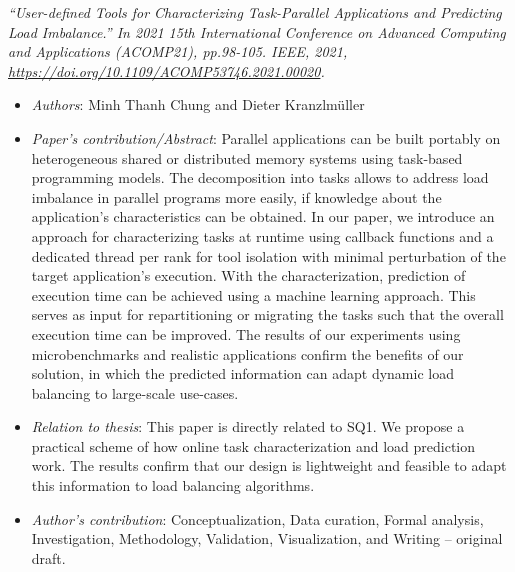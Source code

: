 \textit{``User-defined Tools for Characterizing Task-Parallel Applications and Predicting Load Imbalance.'' In 2021 15th International Conference on Advanced Computing and Applications (ACOMP21), pp.98-105. IEEE, 2021, \url{https://doi.org/10.1109/ACOMP53746.2021.00020}.}
\begin{itemize}
	\item \textit{Authors}: Minh Thanh Chung and Dieter Kranzlmüller
	\item \textit{Paper's contribution/Abstract}: Parallel applications can be built portably on heterogeneous shared or distributed memory systems using task-based programming models. The decomposition into tasks allows to address load imbalance in parallel programs more easily, if knowledge about the application’s characteristics can be obtained. In our paper, we introduce an approach for characterizing tasks at runtime using callback functions and a dedicated thread per rank for tool isolation with minimal perturbation of the target application’s execution. With the characterization, prediction of execution time can be achieved using a machine learning approach. This serves as input for repartitioning or migrating the tasks such that the overall execution time can be improved. The results of our experiments using microbenchmarks and realistic applications confirm the benefits of our solution, in which the predicted information can adapt dynamic load balancing to large-scale use-cases.
	\item \textit{Relation to thesis}: This paper is directly related to SQ1. We propose a practical scheme of how online task characterization and load prediction work. The results confirm that our design is lightweight and feasible to adapt this information to load balancing algorithms.
	\item \textit{Author's contribution}: Conceptualization, Data curation, Formal analysis, Investigation, Methodology, Validation, Visualization, and Writing – original draft.
\end{itemize}

